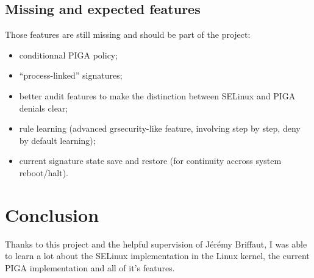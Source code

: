 \documentclass[pdftex,a4paper,titlepage,11pt]{article}
\begin{document}
\subsection{Missing and expected features}

Those features are still missing and should be part of the project:

\begin{itemize}
	\item conditionnal PIGA policy;
	\item ``process-linked'' signatures;
	\item better audit features to make the distinction between SELinux and PIGA denials clear;
	\item rule learning (advanced grsecurity-like feature, involving step by step, deny by default learning);
	\item current signature state save and restore (for continuity accross system reboot/halt).
\end{itemize}

\newpage

\section*{Conclusion} 

Thanks to this project and the helpful supervision of Jérémy Briffaut, I was able to learn a lot about the SELinux implementation in the Linux kernel, the current PIGA implementation and all of it's features.


\newpage

\end{document}
